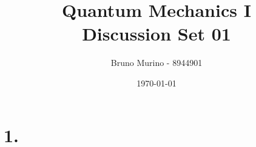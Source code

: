 \documentclass{_mypackages/monograph}
\title{Quantum Mechanics I \\ Discussion Set 01} %
\author{Bruno Murino - 8944901} %
\date{\today} %
\begin{document}

\solutionstp

\chapter*{1.}









\end{document}
